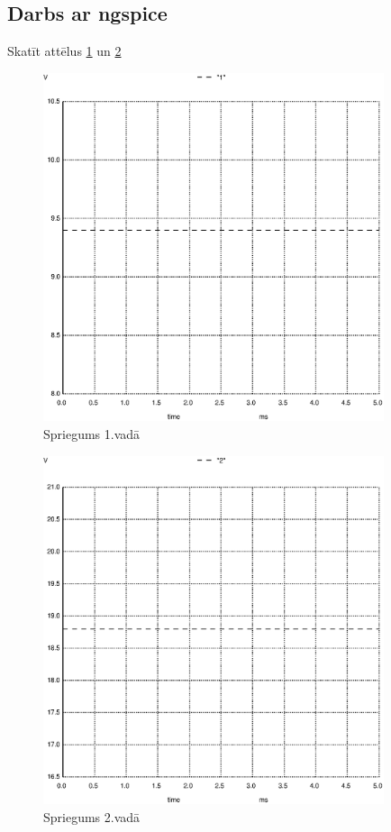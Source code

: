 \documentclass{report}
\begin{document}
\subsection{Darbs ar ngspice}
Skatīt attēlus \ref{fig:2.1} un \ref{fig:2.2} 
\begin{figure}[!h]
    \centering
    \includegraphics[width=10cm]{011.ps}
    \caption{Spriegums 1.vadā}
    \label{fig:2.1}
    \end{figure}
 \begin{figure}[t]
 \centering
    \includegraphics[width=10cm]{012.ps}
    \caption{Spriegums 2.vadā}
    \label{fig:2.2}
\end{figure}
\newpage
\end{document}
